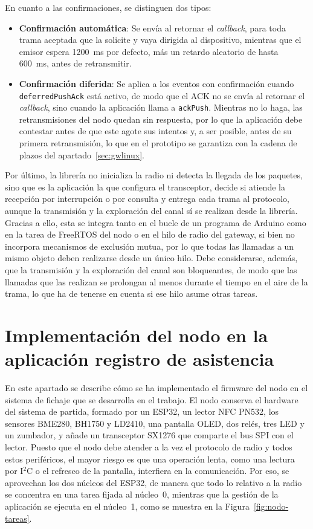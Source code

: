 En cuanto a las confirmaciones, se distinguen dos tipos:

\begin{itemize}
\item \textbf{Confirmación automática}: Se envía al retornar el \textit{callback}, para toda trama aceptada que la solicite y vaya dirigida al dispositivo, mientras que el emisor espera 1200~ms por defecto, más un retardo aleatorio de hasta 600~ms, antes de retransmitir.

\item \textbf{Confirmación diferida}: Se aplica a los eventos con confirmación cuando \texttt{deferredPushAck} está activo, de modo que el ACK no se envía al retornar el \textit{callback}, sino cuando la aplicación llama a \texttt{ackPush}. Mientras no lo haga, las retransmisiones del nodo quedan sin respuesta, por lo que la aplicación debe contestar antes de que este agote sus intentos y, a ser posible, antes de su primera retransmisión, lo que en el prototipo se garantiza con la cadena de plazos del apartado~\ref{sec:gwlinux}.
\end{itemize}

Por último, la librería no inicializa la radio ni detecta la llegada de los paquetes, sino que es la aplicación la que configura el transceptor, decide si atiende la recepción por interrupción o por consulta y entrega cada trama al protocolo, aunque la transmisión y la exploración del canal sí se realizan desde la librería. Gracias a ello, esta se integra tanto en el bucle de un programa de Arduino como en la tarea de FreeRTOS del nodo o en el hilo de radio del gateway, si bien no incorpora mecanismos de exclusión mutua, por lo que todas las llamadas a un mismo objeto deben realizarse desde un único hilo. Debe considerarse, además, que la transmisión y la exploración del canal son bloqueantes, de modo que las llamadas que las realizan se prolongan al menos durante el tiempo en el aire de la trama, lo que ha de tenerse en cuenta si ese hilo asume otras tareas.

\section{Implementación del nodo en la aplicación registro de asistencia}\label{sec:nodo-app}

En este apartado se describe cómo se ha implementado el firmware del nodo en el sistema de fichaje que se desarrolla en el trabajo. El nodo conserva el hardware del sistema de partida, formado por un ESP32, un lector NFC PN532, los sensores BME280, BH1750 y LD2410, una pantalla OLED, dos relés, tres LED y un zumbador, y añade un transceptor SX1276 que comparte el bus SPI con el lector. Puesto que el nodo debe atender a la vez el protocolo de radio y todos estos periféricos, el mayor riesgo es que una operación lenta, como una lectura por I$^2$C o el refresco de la pantalla, interfiera en la comunicación. Por eso, se aprovechan los dos núcleos del ESP32, de manera que todo lo relativo a la radio se concentra en una tarea fijada al núcleo~0, mientras que la gestión de la aplicación se ejecuta en el núcleo~1, como se muestra en la Figura~\ref{fig:nodo-tareas}.

